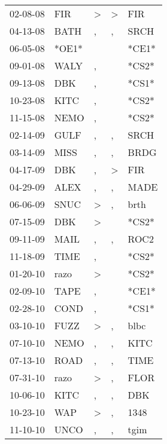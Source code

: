 \begin{supertabular}{lllll}
 02-08-08 &    FIR &  \textgreater &     \textgreater &    FIR \\
 04-13-08 &   BATH &             , &                , &   SRCH \\
 06-05-08 &  *OE1* &               &                  &  *CE1* \\
 09-01-08 &   WALY &             , &                  &  *CS2* \\
 09-13-08 &    DBK &             , &                  &  *CS1* \\
 10-23-08 &   KITC &             , &                  &  *CS2* \\
 11-15-08 &   NEMO &             , &                  &  *CS2* \\
 02-14-09 &   GULF &             , &                , &   SRCH \\
 03-14-09 &   MISS &             , &                , &   BRDG \\
 04-17-09 &    DBK &             , &     \textgreater &    FIR \\
 04-29-09 &   ALEX &             , &                , &   MADE \\
 06-06-09 &   SNUC &  \textgreater &                , &   brth \\
 07-15-09 &    DBK &  \textgreater &                  &  *CS2* \\
 09-11-09 &   MAIL &             , &                , &   ROC2 \\
 11-18-09 &   TIME &             , &                  &  *CS2* \\
 01-20-10 &   razo &  \textgreater &                  &  *CS2* \\
 02-09-10 &   TAPE &             , &                  &  *CE1* \\
 02-28-10 &   COND &             , &                  &  *CS1* \\
 03-10-10 &   FUZZ &  \textgreater &                , &   blbc \\
 07-10-10 &   NEMO &             , &                , &   KITC \\
 07-13-10 &   ROAD &             , &                , &   TIME \\
 07-31-10 &   razo &  \textgreater &                , &   FLOR \\
 10-06-10 &   KITC &             , &                , &    DBK \\
 10-23-10 &    WAP &  \textgreater &                , &   1348 \\
 11-10-10 &   UNCO &             , &                , &   tgim \\

\end{supertabular}
